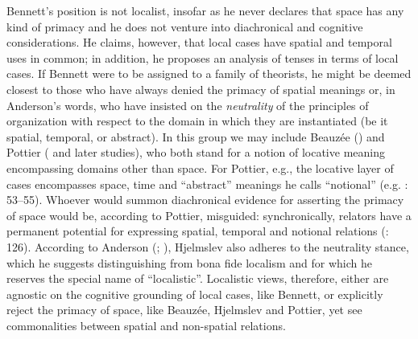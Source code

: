 \documentclass[output=paper]{langscibook}
\begin{document}
Bennett’s position is not localist, insofar as he never declares that space has any kind of primacy and he does not venture into diachronical and cognitive considerations. He claims, however, that local cases have spatial and temporal uses in common; in addition, he proposes an analysis of tenses in terms of local cases. If Bennett were to be assigned to a family of theorists, he might be deemed closest to those who have always denied the primacy of spatial meanings or, in Anderson’s words, who have insisted on the \textit{neutrality} of the principles of organization with respect to the domain in which they are instantiated (be it spatial, temporal, or abstract). In this group we may include Beauzée (\citeyear{beauzee_preposition_1786}) and Pottier (\citeyear{pottier_systematique_1962} and later studies), who both stand for a notion of locative meaning encompassing domains other than space. For Pottier, e.g., the locative layer of cases encompasses space, time and “abstract” meanings he calls “notional” (e.g. \citealt{pottier_linguistique_1974}: 53--55). Whoever would summon diachronical evidence for asserting the primacy of space would be, according to Pottier, misguided: synchronically, relators have a permanent potential for expressing spatial, temporal and notional relations (\citealt{pottier_systematique_1962}: 126). According to Anderson (\citeyear{anderson_grammar_1971}; \citeyear{anderson_localism_1994}), Hjelmslev also adheres to the neutrality stance, which he suggests distinguishing from bona fide localism and for which he reserves the special name of “localistic”. Localistic views, therefore, either are agnostic on the cognitive grounding of local cases, like Bennett, or explicitly reject the primacy of space, like Beauzée, Hjelmslev and Pottier, yet see commonalities between spatial and non-spatial relations.
\end{document}
